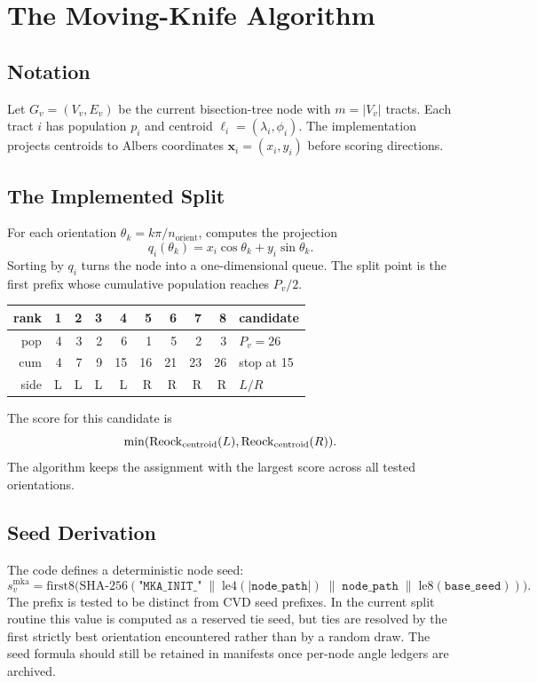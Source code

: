 \section{The Moving-Knife Algorithm}
\label{sec:algorithm}

\subsection{Notation}

Let $G_v=(V_v,E_v)$ be the current bisection-tree node with $m=|V_v|$ tracts.
Each tract $i$ has population $p_i$ and centroid
$\ell_i=(\lambda_i,\phi_i)$. The implementation projects centroids to Albers
coordinates $\mathbf{x}_i=(x_i,y_i)$ before scoring directions.

\subsection{The Implemented Split}

For each orientation $\theta_k=k\pi/n_{\mathrm{orient}}$, \mka{} computes the
projection
\[
  q_i(\theta_k) = x_i\cos\theta_k + y_i\sin\theta_k.
\]
Sorting by $q_i$ turns the node into a one-dimensional queue. The split point
is the first prefix whose cumulative population reaches $P_v/2$.

\begin{center}
\begin{tabular}{r|rrrrrrrr|l}
rank & 1 & 2 & 3 & 4 & 5 & 6 & 7 & 8 & candidate \\
\hline
pop  & 4 & 3 & 2 & 6 & 1 & 5 & 2 & 3 & $P_v=26$ \\
cum  & 4 & 7 & 9 & 15 & 16 & 21 & 23 & 26 & stop at 15 \\
side & L & L & L & L & R & R & R & R & $L/R$
\end{tabular}
\end{center}

The score for this candidate is
\[
  \min(\mathrm{Reock}{}_{\mathrm{centroid}}(L),\mathrm{Reock}{}_{\mathrm{centroid}}(R)).
\]
The algorithm keeps the assignment with the largest score across all tested
orientations.

\subsection{Seed Derivation}
\label{subsec:seed}

The code defines a deterministic node seed:
\[
  s_v^{\mathrm{mka}} = \mathrm{first8}\bigl(
    \mathrm{SHA\text{-}256}(
      \texttt{"MKA\_INIT\_"}
      \;\|\; \mathrm{le4}(|\mathtt{node\_path}|)
      \;\|\; \mathtt{node\_path}
      \;\|\; \mathrm{le8}(\mathtt{base\_seed})
    )
  \bigr).
\]
The prefix is tested to be distinct from CVD seed prefixes. In the current
split routine this value is computed as a reserved tie seed, but ties are
resolved by the first strictly best orientation encountered rather than by a
random draw. The seed formula should still be retained in manifests once
per-node angle ledgers are archived.

